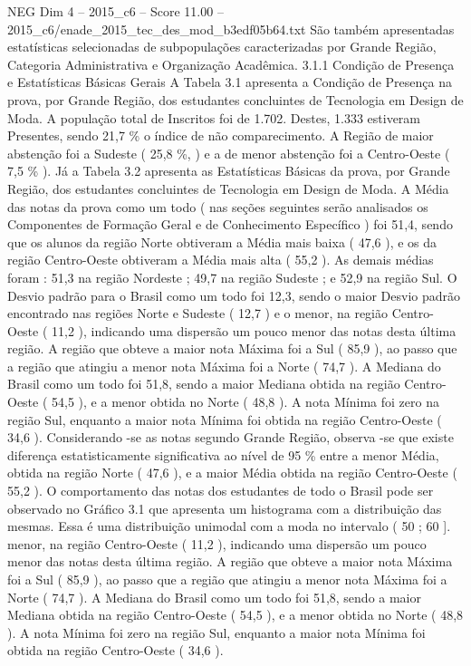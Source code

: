 \begin{textsample}{NEG Dim 4 – 2015\_c6 – Score 11.00 – 2015\_c6/enade\_2015\_tec\_des\_mod\_b3edf05b64.txt}
São também apresentadas estatísticas selecionadas de subpopulações caracterizadas por Grande Região, Categoria Administrativa e Organização Acadêmica. 3.1.1 Condição de Presença e Estatísticas Básicas Gerais A Tabela 3.1 apresenta a Condição de Presença na prova, por Grande Região, dos estudantes concluintes de Tecnologia em Design de Moda.
A população total de Inscritos foi de 1.702.
Destes, 1.333 estiveram Presentes, sendo 21,7 \% o índice de não comparecimento.
A Região de maior abstenção foi a Sudeste ( 25,8 \%, ) e a de menor abstenção foi a Centro-Oeste ( 7,5 \% ).
Já a Tabela 3.2 apresenta as Estatísticas Básicas da prova, por Grande Região, dos estudantes concluintes de Tecnologia em Design de Moda.
A Média das notas da prova como um todo ( nas seções seguintes serão analisados os Componentes de Formação Geral e de Conhecimento Específico ) foi 51,4, sendo que os alunos da região Norte obtiveram a Média mais baixa ( 47,6 ), e os da região Centro-Oeste obtiveram a Média mais alta ( 55,2 ).
As demais médias foram : 51,3 na região Nordeste ; 49,7 na região Sudeste ; e 52,9 na região Sul.
O Desvio padrão para o Brasil como um todo foi 12,3, sendo o maior Desvio padrão encontrado nas regiões Norte e Sudeste ( 12,7 ) e o menor, na região Centro-Oeste ( 11,2 ), indicando uma dispersão um pouco menor das notas desta última região.
A região que obteve a maior nota Máxima foi a Sul ( 85,9 ), ao passo que a região que atingiu a menor nota Máxima foi a Norte ( 74,7 ).
A Mediana do Brasil como um todo foi 51,8, sendo a maior Mediana obtida na região Centro-Oeste ( 54,5 ), e a menor obtida no Norte ( 48,8 ).
A nota Mínima foi zero na região Sul, enquanto a maior nota Mínima foi obtida na região Centro-Oeste ( 34,6 ).
Considerando -se as notas segundo Grande Região, observa -se que existe diferença estatisticamente significativa ao nível de 95 \% entre a menor Média, obtida na região Norte ( 47,6 ), e a maior Média obtida na região Centro-Oeste ( 55,2 ).
O comportamento das notas dos estudantes de todo o Brasil pode ser observado no Gráfico 3.1 que apresenta um histograma com a distribuição das mesmas.
Essa é uma distribuição unimodal com a moda no intervalo ( 50 ; 60 ]. menor, na região Centro-Oeste ( 11,2 ), indicando uma dispersão um pouco menor das notas desta última região.
A região que obteve a maior nota Máxima foi a Sul ( 85,9 ), ao passo que a região que atingiu a menor nota Máxima foi a Norte ( 74,7 ).
A Mediana do Brasil como um todo foi 51,8, sendo a maior Mediana obtida na região Centro-Oeste ( 54,5 ), e a menor obtida no Norte ( 48,8 ).
A nota Mínima foi zero na região Sul, enquanto a maior nota Mínima foi obtida na região Centro-Oeste ( 34,6 ).

\end{textsample}
